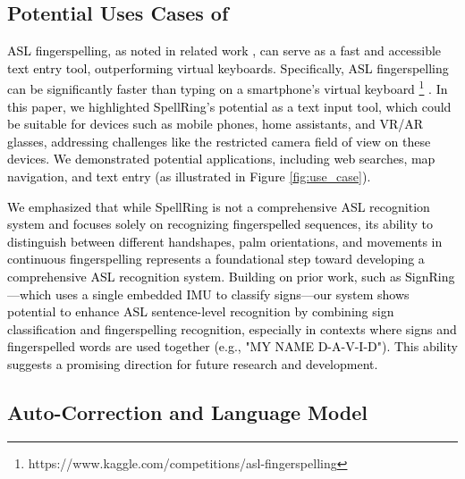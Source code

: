 \subsection{Potential Uses Cases of \theDevice{}}
\textcolor{black}{
ASL fingerspelling, as noted in related work \cite{martin2023fingerspeller, hassan2023tap}, can serve as a fast and accessible text entry tool, outperforming virtual keyboards. Specifically, ASL fingerspelling can be significantly faster than typing on a smartphone’s virtual keyboard \footnote{https://www.kaggle.com/competitions/asl-fingerspelling} \cite{hassan2023tap, martin2023fingerspeller}. In this paper, we highlighted SpellRing’s potential as a text input tool, which could be suitable for devices such as mobile phones, home assistants, and VR/AR glasses, addressing challenges like the restricted camera field of view on these devices. We demonstrated potential applications, including web searches, map navigation, and text entry (as illustrated in Figure \ref{fig:use_case}).}

\textcolor{black}{
We emphasized that while SpellRing is not a comprehensive ASL recognition system and focuses solely on recognizing fingerspelled sequences, its ability to distinguish between different handshapes, palm orientations, and movements in continuous fingerspelling represents a foundational step toward developing a comprehensive ASL recognition system. Building on prior work, such as SignRing \cite{li2023signring}—which uses a single embedded IMU to classify signs—our system shows potential to enhance ASL sentence-level recognition by combining sign classification and fingerspelling recognition, especially in contexts where signs and fingerspelled words are used together (e.g., "MY NAME D-A-V-I-D"). This ability suggests a promising direction for future research and development.
}


\subsection{Auto-Correction and Language Model}\label{auto_correction}

